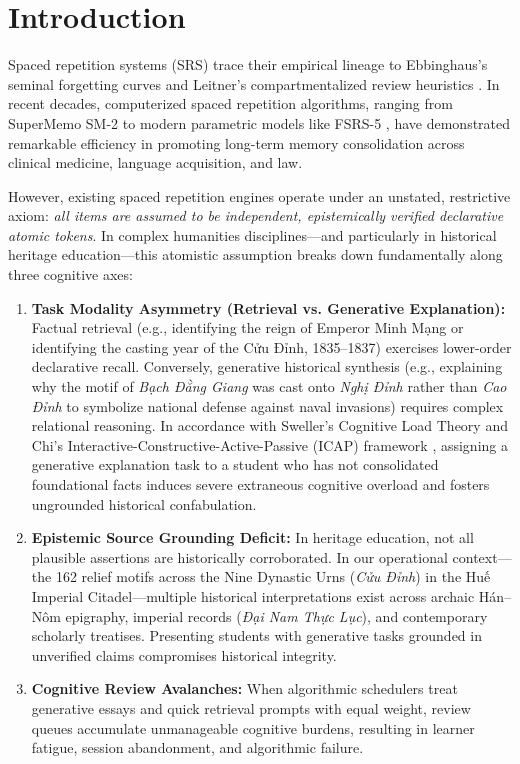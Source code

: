 \documentclass[11pt,a4paper]{article}
\begin{document}
\section{Introduction}
\label{sec:introduction}

Spaced repetition systems (SRS) trace their empirical lineage to Ebbinghaus's seminal forgetting curves \cite{ebbinghaus1885} and Leitner's compartmentalized review heuristics \cite{leitner1972}. In recent decades, computerized spaced repetition algorithms, ranging from SuperMemo SM-2 \cite{wozniak1990} to modern parametric models like FSRS-5 \cite{ye2024fsrs}, have demonstrated remarkable efficiency in promoting long-term memory consolidation across clinical medicine, language acquisition, and law.

However, existing spaced repetition engines operate under an unstated, restrictive axiom: \textit{all items are assumed to be independent, epistemically verified declarative atomic tokens}. In complex humanities disciplines---and particularly in historical heritage education---this atomistic assumption breaks down fundamentally along three cognitive axes:
\begin{enumerate}[leftmargin=*]
    \item \textbf{Task Modality Asymmetry (Retrieval vs. Generative Explanation):} Factual retrieval (e.g., identifying the reign of Emperor Minh Mạng or identifying the casting year of the Cửu Đỉnh, 1835--1837) exercises lower-order declarative recall. Conversely, generative historical synthesis (e.g., explaining why the motif of \textit{Bạch Đằng Giang} was cast onto \textit{Nghị Đỉnh} rather than \textit{Cao Đỉnh} to symbolize national defense against naval invasions) requires complex relational reasoning. In accordance with Sweller's Cognitive Load Theory \cite{sweller1988} and Chi's Interactive-Constructive-Active-Passive (ICAP) framework \cite{chi2009}, assigning a generative explanation task to a student who has not consolidated foundational facts induces severe extraneous cognitive overload and fosters ungrounded historical confabulation.
    \item \textbf{Epistemic Source Grounding Deficit:} In heritage education, not all plausible assertions are historically corroborated. In our operational context---the 162 relief motifs across the Nine Dynastic Urns (\textit{Cửu Đỉnh}) in the Huế Imperial Citadel---multiple historical interpretations exist across archaic Hán--Nôm epigraphy, imperial records (\textit{Đại Nam Thực Lục}), and contemporary scholarly treatises. Presenting students with generative tasks grounded in unverified claims compromises historical integrity.
    \item \textbf{Cognitive Review Avalanches:} When algorithmic schedulers treat generative essays and quick retrieval prompts with equal weight, review queues accumulate unmanageable cognitive burdens, resulting in learner fatigue, session abandonment, and algorithmic failure.
\end{enumerate}
\end{document}
